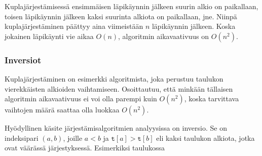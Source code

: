 \begin{center}
\end{center}


Kuplajärjestämisessä ensimmäisen läpikäynnin jälkeen suurin alkio
on paikallaan, toisen läpikäynnin jälkeen
kaksi suurinta alkiota on paikallaan, jne.
Niinpä kuplajärjestäminen päättyy aina viimeistään $n$
läpikäynnin jälkeen.
Koska jokainen läpikäynti vie aikaa $O(n)$,
algoritmin aikavaativuus on $O(n^2)$.

\subsubsection{Inversiot}


Kuplajärjestäminen on esimerkki algoritmista,
joka perustuu taulukon vierekkäisten alkioiden
vaihtamiseen.
Osoittautuu, että minkään tällaisen algoritmin
aikavaativuus ei voi olla parempi kuin $O(n^2)$,
koska tarvittava vaihtojen määrä
saattaa olla luokkaa $O(n^2)$.

Hyödyllinen käsite järjestämisalgoritmien
analyysissa on inversio.
Se on indeksipari $(a,b)$, joille $a<b$
ja $\texttt{t}[a]>\texttt{t}[b]$
eli kaksi taulukon alkiota, jotka ovat väärässä
järjestyksessä.
Esimerkiksi taulukossa

\begin{center}
\end{center}

